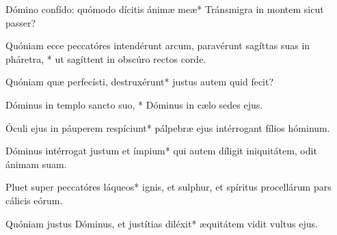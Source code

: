 \begin{psalmus}

     Dómino confído: quómodo dícitis ánimæ meæ* Tránsmigra in montem sicut passer?

    Quóniam ecce peccatóres intendérunt arcum, paravérunt sagíttas suas in pháretra, * ut sagíttent in obscúro rectos corde.

    Quóniam quæ perfecísti, destruxérunt* justus autem quid fecit?

    Dóminus in templo sancto suo, * Dóminus in cælo sedes ejus.

    Óculi ejus in páuperem respíciunt* pálpebræ ejus intérrogant fílios hóminum.

    Dóminus intérrogat justum et ímpium* qui autem díligit iniquitátem, odit ánimam suam.

    Pluet super peccatóres láqueos* ignis, et sulphur, et spíritus procellárum pars cálicis eórum.

    Quóniam justus Dóminus, et justítias diléxit* æquitátem vidit vultus ejus.

\end{psalmus}
